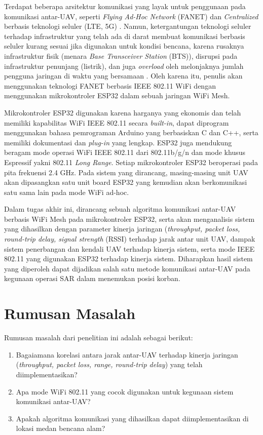 Terdapat beberapa arsitektur komunikasi yang layak untuk penggunaan pada komunikasi antar-UAV, seperti \textit{Flying Ad-Hoc Network} (FANET) \cite{khanFlyingAdhocNetworks2017} dan \textit{Centralized} berbasis teknologi seluler (LTE, 5G) \cite{linSkyNotLimit2018}. Namun, ketergantungan teknologi seluler terhadap infrastruktur yang telah ada di darat membuat komunikasi berbasis seluler kurang sesuai jika digunakan untuk kondisi bencana, karena rusaknya infrastruktur fisik (menara \textit{Base Transceiver Station} (BTS)), disrupsi pada infrastruktur penunjang (listrik), dan juga \textit{overload} oleh melonjaknya jumlah pengguna jaringan di waktu yang bersamaan  \cite{townsendTelecommunicationsInfrastructureDisasters2005}. Oleh karena itu, penulis akan menggunakan teknologi FANET berbasis IEEE 802.11 WiFi dengan menggunakan mikrokontroler ESP32 dalam sebuah jaringan WiFi Mesh.

Mikrokontroler ESP32 digunakan karena harganya yang ekonomis dan telah memiliki kapabilitas WiFi IEEE 802.11 secara \textit{built-in}, dapat diprogram menggunakan bahasa pemrograman Arduino yang berbasiskan C dan C++, serta memiliki dokumentasi dan \textit{plug-in} yang lengkap. ESP32 juga mendukung beragam mode operasi WiFi IEEE 802.11 dari 802.11b/g/n dan mode khusus Espressif yakni 802.11 \textit{Long Range}. Setiap mikrokontroler ESP32 beroperasi pada pita frekuensi 2.4 GHz. Pada sistem yang dirancang, masing-masing unit UAV akan dipasangkan satu unit board ESP32 yang kemudian akan berkomunikasi satu sama lain pada mode WiFi ad-hoc.

Dalam tugas akhir ini, dirancang sebuah algoritma komunikasi antar-UAV berbasis WiFi Mesh pada mikrokontroler ESP32, serta akan menganalisis sistem yang dihasilkan dengan parameter kinerja jaringan (\textit{throughput, packet loss, round-trip delay, signal strength }(RSSI) terhadap jarak antar unit UAV, dampak sistem penerbangan dan kendali UAV terhadap kinerja sistem, serta mode IEEE 802.11 yang digunakan ESP32 terhadap kinerja sistem. Diharapkan hasil sistem yang diperoleh dapat dijadikan salah satu metode komunikasi antar-UAV pada kegunaan operasi SAR dalam menemukan posisi korban.

\section{Rumusan Masalah}
Rumusan masalah dari penelitian ini adalah sebagai berikut:
\begin{enumerate}
	\item Bagaiamana korelasi antara jarak antar-UAV terhadap kinerja jaringan (\textit{throughput, packet loss, range, round-trip delay}) yang telah diimplementasikan?
	\item Apa mode WiFi 802.11 yang cocok digunakan untuk kegunaan sistem komunikasi antar-UAV?
	\item Apakah algoritma komunikasi yang dihasilkan dapat diimplementasikan di lokasi medan bencana alam?
\end{enumerate}

